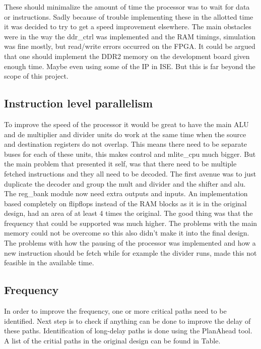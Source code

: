 \documentclass[final]{article}
\begin{document}
These should minimalize the amount of time the processor was to wait for data or instructions.
Sadly because of trouble implementing these in the allotted time it was decided to try to get a speed improvement elsewhere.
The main obstacles were in the way the ddr\_ctrl was implemented and the RAM timings, simulation was fine mostly, but read/write errors occurred on the FPGA.
It could be argued that one should implement the DDR2 memory on the development board given enough time.
Maybe even using some of the IP in ISE.
But this is far beyond the scope of this project.

\subsection{Instruction level parallelism}
To improve the speed of the processor it would be great to have the main ALU and de multiplier and divider units do work at the same time when the source and destination registers do not overlap.
This means there need to be separate buses for each of these units, this makes control and mlite\_cpu much bigger.
But the main problem that presented it self, was that there need to be multiple fetched instructions and they all need to be decoded.
The first avenue was to just duplicate the decoder and group the mult and divider and the shifter and alu.
The reg\_bank module now need extra outputs and inputs.
An implementation based completely on flipflops instead of the RAM blocks as it is in the original design, had an area of at least 4 times the original.
The good thing was that the frequency that could be supported was much higher.
The problems with the main memory could not be overcome so this also didn't make it into the final design.
The problems with how the pausing of the processor was implemented and how a new instruction should be fetch while for example the divider runs, made this not feasible in the available time.

\subsection{Frequency}
In order to improve the frequency, one or more critical paths need to be identified. Next step is to check if anything can be done to improve the delay of these paths. Identification of long-delay paths is done using the PlanAhead tool. A list of the critial paths in the original design can be found in Table.
\end{document}
